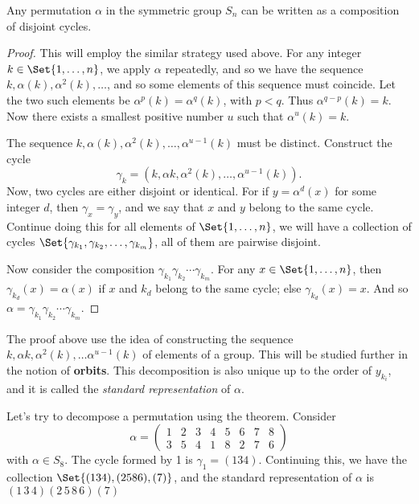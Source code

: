 \documentclass[main.tex]{subfiles}
\begin{document}
				\begin{theorem}
					Any permutation $\alpha$ in the symmetric group $S_n$ can be written as a composition of disjoint cycles.
				\end{theorem}
				\begin{proof}
					This will employ the similar strategy used above. For any integer $k \in \Set{1, \ldots, n}$, we apply $\alpha$ repeatedly, and so we have the sequence $k, \alpha (k), \alpha^2 (k), \ldots$, and so some elements of this sequence must coincide. Let the two such elements be $\alpha^p(k) = \alpha^q (k)$, with $p < q$. Thus $\alpha^{q - p}(k) = k$. Now there exists a smallest positive number $u$ such that $\alpha^u (k) = k$.
					
					The sequence  $k, \alpha (k), \alpha^2 (k), \ldots, \alpha^{u-1}(k)$ must be distinct. Construct the cycle 
					\begin{equation*}
					\gamma_k = (k, \alpha k, \alpha^2 (k), \ldots, \alpha^{u-1}(k)).
					\end{equation*} 
					Now, two cycles are either disjoint or identical. For if $y = \alpha^{d} (x)$ for some integer $d$, then $\gamma_x = \gamma_y$, and we say that $x$ and $y$ belong to the same cycle. Continue doing this for all elements of $\Set{1, \ldots, n}$, we will have a collection of cycles $\Set{\gamma_{k_1}, \gamma_{k_2}, \ldots, \gamma_{k_m}}$, all of them are pairwise disjoint.
					
					Now consider the composition $\gamma_{k_1}\gamma_{k_2}\cdots\gamma_{k_m}$. For any $x \in \Set{1, \ldots, n}$, then $\gamma_{k_d}(x) = \alpha(x)$ if $x$ and $k_d$ belong to the same cycle; else $\gamma_{k_d}(x) = x$. And so $\alpha = \gamma_{k_1}\gamma_{k_2}\cdots\gamma_{k_m}$.
				\end{proof}
				The proof above use the idea of constructing the sequence $k, \alpha k, \alpha^2 (k), \ldots \alpha^{u-1} (k)$ of elements of a group. This will be studied further in the notion of \textbf{orbits}. This decomposition is also unique up to the order of $y_{k_i}$, and it is called the \textit{standard representation} of $\alpha$.
				
				Let's try to decompose a permutation using the theorem. Consider
				\begin{equation*}
				\alpha =
				\begin{pmatrix}
				1 & 2 & 3 & 4 & 5 & 6 & 7 & 8 \\
				3 & 5 & 4 & 1 & 8 & 2 & 7 & 6
				\end{pmatrix}
				\end{equation*}
				with $\alpha \in S_{8}$. The cycle formed by 1 is $\gamma_1 = (1 3 4)$. Continuing this, we have the collection $\Set{(1 3 4), (2 5 8 6), (7)}$, and the standard representation of $\alpha$ is $(1\,3\,4)(2\,5\, 8\,6)(7)$
				
\end{document}
